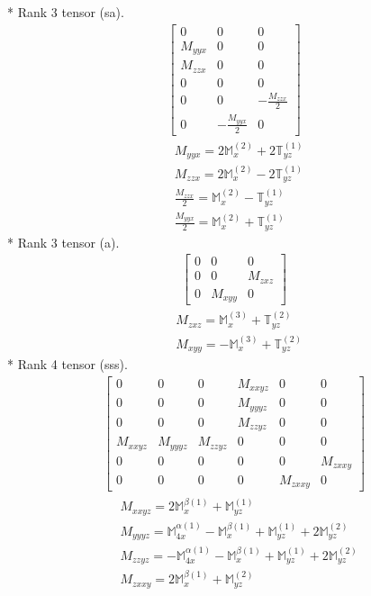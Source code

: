 \documentclass[fleqn,8pt,landscape]{jsarticle}
\begin{document}
* Rank 3 tensor (sa).
\begin{align*}
\begin{bmatrix} 0 & 0 & 0 \\ M_{yyx} & 0 & 0 \\ M_{zzx} & 0 & 0 \\ 0 & 0 & 0 \\ 0 & 0 & - \frac{M_{zzx}}{2} \\ 0 & - \frac{M_{yyx}}{2} & 0 \end{bmatrix}
\end{align*}
\begin{align*}
& M_{yyx} = 2 \mathbb{M}_{x}^{(2)} + 2 \mathbb{T}_{yz}^{(1)} \\
& M_{zzx} = 2 \mathbb{M}_{x}^{(2)} - 2 \mathbb{T}_{yz}^{(1)} \\
& \frac{M_{zzx}}{2} = \mathbb{M}_{x}^{(2)} - \mathbb{T}_{yz}^{(1)} \\
& \frac{M_{yyx}}{2} = \mathbb{M}_{x}^{(2)} + \mathbb{T}_{yz}^{(1)}
\end{align*}
* Rank 3 tensor (a).
\begin{align*}
\begin{bmatrix} 0 & 0 & 0 \\ 0 & 0 & M_{zxz} \\ 0 & M_{xyy} & 0 \end{bmatrix}
\end{align*}
\begin{align*}
& M_{zxz} = \mathbb{M}_{x}^{(3)} + \mathbb{T}_{yz}^{(2)} \\
& M_{xyy} = - \mathbb{M}_{x}^{(3)} + \mathbb{T}_{yz}^{(2)}
\end{align*}
* Rank 4 tensor (sss).
\begin{align*}
\begin{bmatrix} 0 & 0 & 0 & M_{xxyz} & 0 & 0 \\ 0 & 0 & 0 & M_{yyyz} & 0 & 0 \\ 0 & 0 & 0 & M_{zzyz} & 0 & 0 \\ M_{xxyz} & M_{yyyz} & M_{zzyz} & 0 & 0 & 0 \\ 0 & 0 & 0 & 0 & 0 & M_{zxxy} \\ 0 & 0 & 0 & 0 & M_{zxxy} & 0 \end{bmatrix}
\end{align*}
\begin{align*}
& M_{xxyz} = 2 \mathbb{M}_{x}^{\beta(1)} + \mathbb{M}_{yz}^{(1)} \\
& M_{yyyz} = \mathbb{M}_{4x}^{\alpha(1)} - \mathbb{M}_{x}^{\beta(1)} + \mathbb{M}_{yz}^{(1)} + 2 \mathbb{M}_{yz}^{(2)} \\
& M_{zzyz} = - \mathbb{M}_{4x}^{\alpha(1)} - \mathbb{M}_{x}^{\beta(1)} + \mathbb{M}_{yz}^{(1)} + 2 \mathbb{M}_{yz}^{(2)} \\
& M_{zxxy} = 2 \mathbb{M}_{x}^{\beta(1)} + \mathbb{M}_{yz}^{(2)}
\end{align*}
\end{document}
